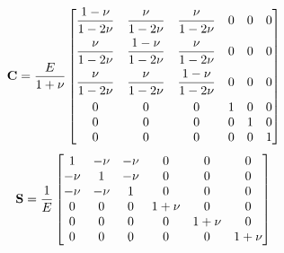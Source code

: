 \begin{equation}
  \mathbf{C} = \frac{E}{1+\nu}
  \begin{bmatrix}
    \dfrac{1-\nu}{1-2\nu} & \dfrac{\nu}{1-2\nu} & \dfrac{\nu}{1-2\nu} & 0 & 0 & 0\\[8pt]
    \dfrac{\nu}{1-2\nu} & \dfrac{1-\nu}{1-2\nu} & \dfrac{\nu}{1-2\nu} & 0 & 0 & 0\\[8pt]
    \dfrac{\nu}{1-2\nu} & \dfrac{\nu}{1-2\nu} & \dfrac{1-\nu}{1-2\nu} & 0 & 0 & 0\\[8pt]
    0 & 0 & 0 & 1 & 0 & 0\\
    0 & 0 & 0 & 0 & 1 & 0\\
    0 & 0 & 0 & 0 & 0 & 1
  \end{bmatrix}
\end{equation}
\begin{equation}
  \mathbf{S} = \frac{1}{E}
  \begin{bmatrix}
    1 & -\nu & -\nu & 0 & 0 & 0\\
    -\nu & 1 & -\nu & 0 & 0 & 0\\
    -\nu & -\nu & 1 & 0 & 0 & 0\\
    0 & 0 & 0 & 1+\nu & 0 & 0\\
    0 & 0 & 0 & 0 & 1+\nu & 0\\
    0 & 0 & 0 & 0 & 0 & 1+\nu
  \end{bmatrix}
\end{equation}

